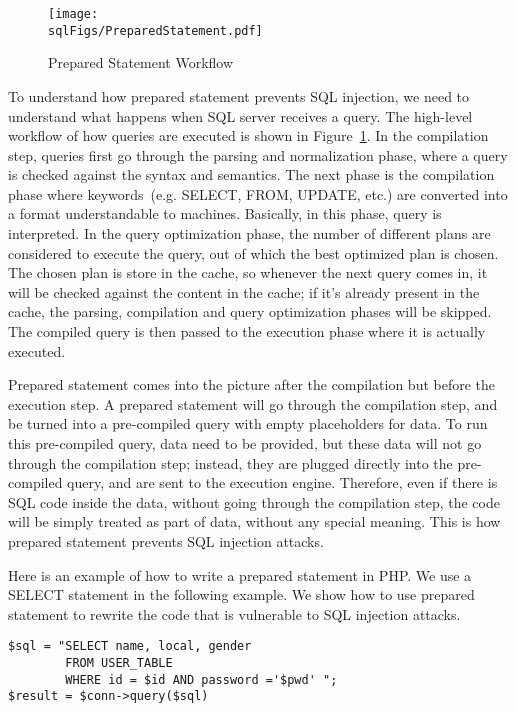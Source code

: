 \begin{figure}
\centering
\texttt{[image: \\sqlFigs/PreparedStatement.pdf]}
\caption{Prepared Statement Workflow}
\label{sql:fig:preparedstatement}
\end{figure}


To understand how prepared statement prevents SQL injection, 
we need to understand what happens when SQL server receives a query. 
The high-level workflow of how queries are executed is shown in Figure~\ref{sql:fig:preparedstatement}.
In the compilation step, queries first go through the parsing and normalization phase, 
where a query is checked against the syntax and semantics. 
The next phase is the compilation phase where keywords~(e.g. SELECT, FROM, UPDATE, etc.) 
are converted into a format understandable to machines. 
Basically, in this phase, query is interpreted.
In the query optimization phase, the number of different plans are considered to 
execute the query,  out of which the best optimized plan is chosen. 
The chosen plan is store in the cache, so 
whenever the next query comes in, 
it will be checked against the content in the cache; if it's already present in the cache,
the parsing, compilation and query optimization phases will be skipped. 
The compiled query is then passed to the execution phase 
where it is actually executed.


Prepared statement comes into the picture after the compilation but before the execution step. 
A prepared statement will go through the compilation step, and be turned into
a pre-compiled query with empty placeholders for data. To run this pre-compiled query,
data need to be provided, but these data will not go through the compilation step; instead,
they are plugged directly into the pre-compiled query, and are sent to the execution engine.
Therefore, even if there is SQL code inside the data, without going through the compilation
step, the code will be simply treated as part of data, without any special meaning.  
This is how prepared statement prevents SQL injection attacks.


Here is an example of how to write a prepared statement in PHP.  We use a SELECT statement in
the following example.  We show how to use prepared statement to rewrite the code that is
vulnerable to SQL injection attacks.


\begin{lstlisting}
$sql = "SELECT name, local, gender  
        FROM USER_TABLE 
        WHERE id = $id AND password ='$pwd' ";
$result = $conn->query($sql)
\end{lstlisting}

